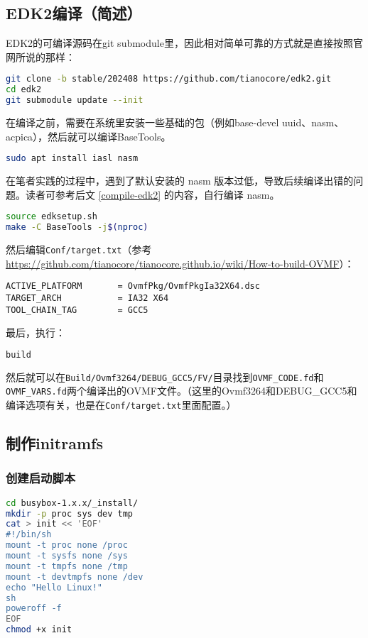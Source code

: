 \subsection{EDK2编译（简述）}

EDK2的可编译源码在git submodule里，因此相对简单可靠的方式就是直接按照官网所说的那样：
\begin{lstlisting}[language=bash]
git clone -b stable/202408 https://github.com/tianocore/edk2.git
cd edk2
git submodule update --init
\end{lstlisting}

在编译之前，需要在系统里安装一些基础的包（例如base-devel uuid、nasm、acpica），然后就可以编译BaseTools。

\begin{lstlisting}[language=bash]
    sudo apt install iasl nasm
\end{lstlisting}

在笔者实践的过程中，遇到了默认安装的 nasm 版本过低，导致后续编译出错的问题。读者可参考后文 \ref{compile-edk2} 的内容，自行编译 nasm。

\begin{lstlisting}[language=bash]
source edksetup.sh
make -C BaseTools -j$(nproc)
\end{lstlisting}
然后编辑\texttt{Conf/target.txt}（参考\url{https://github.com/tianocore/tianocore.github.io/wiki/How-to-build-OVMF}）：
\begin{lstlisting}
ACTIVE_PLATFORM       = OvmfPkg/OvmfPkgIa32X64.dsc
TARGET_ARCH           = IA32 X64
TOOL_CHAIN_TAG        = GCC5
\end{lstlisting}
最后，执行：
\begin{lstlisting}[language=bash]
build
\end{lstlisting}
然后就可以在\texttt{Build/Ovmf3264/DEBUG\_GCC5/FV/}目录找到\texttt{OVMF\_CODE.fd}和\texttt{OVMF\_VARS.fd}两个编译出的OVMF文件。（这里的Ovmf3264和DEBUG\_GCC5和编译选项有关，也是在\texttt{Conf/target.txt}里面配置。）

\subsection{制作initramfs}
\subsubsection{创建启动脚本}
\begin{lstlisting}[language=bash, language=bash, showstringspaces=false]
cd busybox-1.x.x/_install/
mkdir -p proc sys dev tmp
cat > init << 'EOF'
#!/bin/sh
mount -t proc none /proc
mount -t sysfs none /sys
mount -t tmpfs none /tmp
mount -t devtmpfs none /dev
echo "Hello Linux!"
sh
poweroff -f
EOF
chmod +x init
\end{lstlisting}

